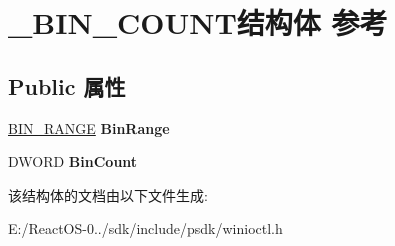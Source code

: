 \hypertarget{struct___b_i_n___c_o_u_n_t}{}\section{\+\_\+\+B\+I\+N\+\_\+\+C\+O\+U\+N\+T结构体 参考}
\label{struct___b_i_n___c_o_u_n_t}
\subsection*{Public 属性}
\begin{DoxyCompactItemize}
\item 
\mbox{\label{struct___b_i_n___c_o_u_n_t_a994dbcaa95194b1731032d7376909e33}} 
\hyperlink{struct___b_i_n___r_a_n_g_e}{B\+I\+N\+\_\+\+R\+A\+N\+GE} {\bfseries Bin\+Range}
\item 
\mbox{\label{struct___b_i_n___c_o_u_n_t_a181918832b640e7527eedc2c4b85b962}} 
D\+W\+O\+RD {\bfseries Bin\+Count}
\end{DoxyCompactItemize}


该结构体的文档由以下文件生成\+:\begin{DoxyCompactItemize}
\item 
E\+:/\+React\+O\+S-\/0../sdk/include/psdk/winioctl.\+h\end{DoxyCompactItemize}
